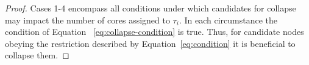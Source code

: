 \begin{theorem}
\begin{proof}
    
    Cases 1-4 encompass all conditions under which candidates for
    collapse may impact the number of cores assigned to ${\tau_i}$. In
    each circumstance the condition of Equation
    ~\ref{eq:collapse-condition} is true. Thus, for candidate nodes
    obeying the restriction described by Equation~\ref{eq:condition}
    it is beneficial to collapse them.
  \end{proof}
\end{theorem}
